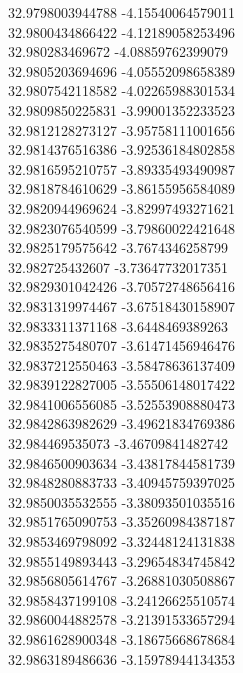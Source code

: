 {32.9798003944788	-4.15540064579011\\
32.9800434866422	-4.12189058253496\\
32.980283469672	-4.08859762399079\\
32.9805203694696	-4.05552098658389\\
32.9807542118582	-4.02265988301534\\
32.9809850225831	-3.99001352233523\\
32.9812128273127	-3.95758111001656\\
32.9814376516386	-3.92536184802858\\
32.9816595210757	-3.89335493490987\\
32.9818784610629	-3.86155956584089\\
32.9820944969624	-3.82997493271621\\
32.9823076540599	-3.79860022421648\\
32.9825179575642	-3.7674346258799\\
32.982725432607	-3.73647732017351\\
32.9829301042426	-3.70572748656416\\
32.9831319974467	-3.67518430158907\\
32.9833311371168	-3.6448469389263\\
32.9835275480707	-3.61471456946476\\
32.9837212550463	-3.58478636137409\\
32.9839122827005	-3.55506148017422\\
32.9841006556085	-3.52553908880473\\
32.9842863982629	-3.49621834769386\\
32.984469535073	-3.46709841482742\\
32.9846500903634	-3.43817844581739\\
32.9848280883733	-3.40945759397025\\
32.9850035532555	-3.38093501035516\\
32.9851765090753	-3.35260984387187\\
32.9853469798092	-3.32448124131838\\
32.9855149893443	-3.29654834745842\\
32.9856805614767	-3.26881030508867\\
32.9858437199108	-3.24126625510574\\
32.9860044882578	-3.21391533657294\\
32.9861628900348	-3.18675668678684\\
32.9863189486636	-3.15978944134353\\
}
